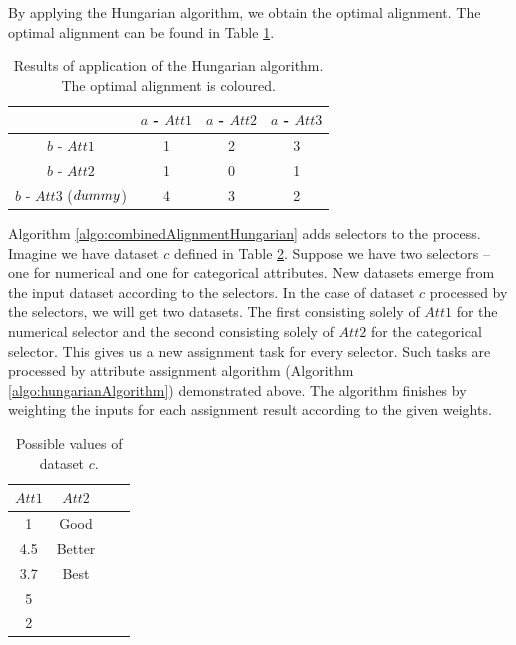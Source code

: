 By applying the Hungarian algorithm, we obtain the optimal alignment. The optimal alignment can be found in Table \ref{table:distancematrix2}.
\begin{table}
\caption{Results of application of the Hungarian algorithm. The optimal alignment is coloured.}
\label{table:distancematrix2}
\centering

\begin{tabular}{ |c | c | c |c | }
  \hline
  & $a$ - $Att1$ & $a$ - $Att2$ & $a$ - $Att3$  \\
  \hline                       
  $b$ - $Att1$ & \cellcolor{blue!25}1 & 2 & 3  \\
  $b$ - $Att2$ & 1 &\cellcolor{blue!25}0 & 1  \\
  $b$ - $Att3$ ($dummy$) & 4  & 3 & \cellcolor{blue!25}2  \\
    \hline  
\end{tabular}
\end{table}

Algorithm \ref{algo:combinedAlignmentHungarian} adds selectors to the process. Imagine we have dataset $c$ defined in Table \ref{table:datasetc}. Suppose we have two selectors -- one for numerical and one for categorical attributes. New datasets emerge from the input dataset according to the selectors. In the case of dataset $c$ processed by the selectors, we will get two datasets. The first consisting solely of $Att1$ for the numerical selector and the second consisting solely of $Att2$ for the categorical selector.
This gives us a new assignment task for every selector. Such tasks are processed by attribute assignment algorithm (Algorithm \ref{algo:hungarianAlgorithm}) demonstrated above.
The algorithm finishes by weighting the inputs for each assignment result according to the given weights.

 \begin{table}[htbp]
	\caption{Possible values of dataset $c$.}
	\label{table:datasetc}
	\centering
	\begin{tabular}{ |c | c | c |c | }
		\hline
		$Att1$ & $Att2$  \\
		\hline                       
		1 &  Good \\
		4.5 &  Better \\
		3.7 &  Best \\
		5 &    \\
		2 &    \\
		\hline  
	\end{tabular}
\end{table} 

